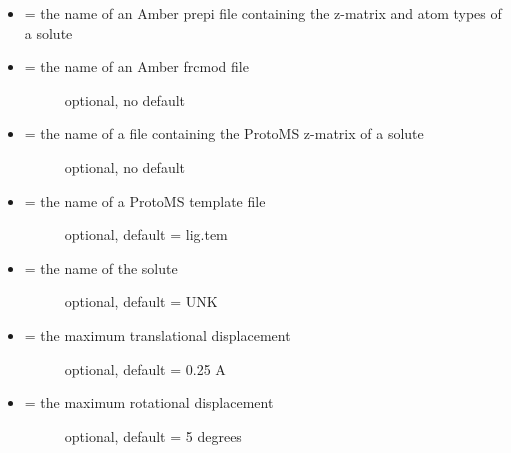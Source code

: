 \documentclass[letterpaper,10pt,english]{sphinxmanual}
\begin{document}
\begin{itemize}
\item {} 
 = the name of an Amber prepi file containing the z-matrix and atom types of a solute

\item {} \begin{description}
\item[{ = the name of an Amber frcmod file}] \leavevmode
optional, no default

\end{description}

\item {} \begin{description}
\item[{ = the name of a file containing the ProtoMS z-matrix of a solute}] \leavevmode
optional, no default

\end{description}

\item {} \begin{description}
\item[{ = the name of a ProtoMS template file}] \leavevmode
optional, default = lig.tem

\end{description}

\item {} \begin{description}
\item[{ = the name of the solute}] \leavevmode
optional, default = UNK

\end{description}

\item {} \begin{description}
\item[{ = the maximum translational displacement}] \leavevmode
optional, default = 0.25 A

\end{description}

\item {} \begin{description}
\item[{ = the maximum rotational displacement}] \leavevmode
optional, default = 5 degrees

\end{description}

\end{itemize}
\end{document}
